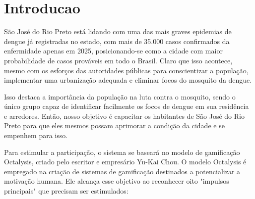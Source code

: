 \documentclass[a5paper, 12pt]{article}
\begin{document}
\section{Introducao}

São José do Rio Preto está lidando com uma das mais graves epidemias de dengue já registradas no estado, com mais de 35.000 casos confirmados da enfermidade apenas em 2025, posicionando-se como a cidade com maior probabilidade de casos prováveis em todo o Brasil. Claro que isso acontece, mesmo com os esforços das autoridades públicas para conscientizar a população, implementar uma urbanização adequada e eliminar focos do mosquito da dengue.

Isso destaca a importância da população na luta contra o mosquito, sendo o único grupo capaz de identificar facilmente os focos de dengue em sua residência e arredores. Então, nosso objetivo é capacitar os habitantes de São José do Rio Preto para que eles mesmos possam aprimorar a condição da cidade e se empenhem para isso.

Para estimular a participação, o sistema se baseará no modelo de gamificação Octalysis, criado pelo escritor e empresário Yu-Kai Chou.  O modelo Octalysis é empregado na criação de sistemas de gamificação destinados a potencializar a motivação humana.  Ele alcança esse objetivo ao reconhecer oito "impulsos principais" que precisam ser estimulados:
\end{document}
